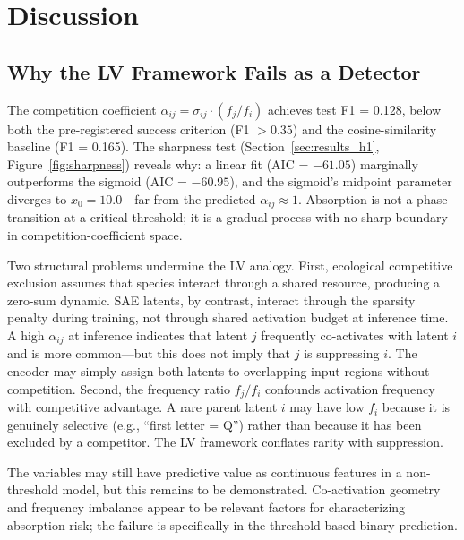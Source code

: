 \documentclass{article}
\begin{document}
\section{Discussion}
\label{sec:discussion}

\subsection{Why the LV Framework Fails as a Detector}

The competition coefficient $\alpha_{ij} = \sigma_{ij} \cdot (f_j / f_i)$ achieves test F1 = 0.128, below both the pre-registered success criterion (F1 $> 0.35$) and the cosine-similarity baseline (F1 = 0.165). The sharpness test (Section~\ref{sec:results_h1}, Figure~\ref{fig:sharpness}) reveals why: a linear fit (AIC = $-61.05$) marginally outperforms the sigmoid (AIC = $-60.95$), and the sigmoid's midpoint parameter diverges to $x_0 = 10.0$---far from the predicted $\alpha_{ij} \approx 1$. Absorption is not a phase transition at a critical threshold; it is a gradual process with no sharp boundary in competition-coefficient space.

Two structural problems undermine the LV analogy. First, ecological competitive exclusion assumes that species interact through a shared resource, producing a zero-sum dynamic. SAE latents, by contrast, interact through the sparsity penalty during training, not through shared activation budget at inference time. A high $\alpha_{ij}$ at inference indicates that latent $j$ frequently co-activates with latent $i$ and is more common---but this does not imply that $j$ is suppressing $i$. The encoder may simply assign both latents to overlapping input regions without competition. Second, the frequency ratio $f_j / f_i$ confounds activation frequency with competitive advantage. A rare parent latent $i$ may have low $f_i$ because it is genuinely selective (e.g., ``first letter = Q'') rather than because it has been excluded by a competitor. The LV framework conflates rarity with suppression.

The variables may still have predictive value as continuous features in a non-threshold model, but this remains to be demonstrated. Co-activation geometry and frequency imbalance appear to be relevant factors for characterizing absorption risk; the failure is specifically in the threshold-based binary prediction.
\end{document}

